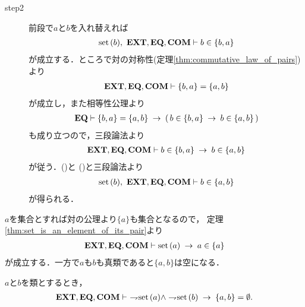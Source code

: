 \begin{sketch}
\begin{description}
			\item[step2]
				前段で$a$と$b$を入れ替えれば
				\begin{align}
					\operatorname*{set}\hspace{0.15em}(b),\ \mbox{{\bf EXT}},\mbox{{\bf EQ}},\mbox{\bf COM} \vdash b \in \{b,a\}
					\label{fom:set_is_an_element_of_its_pair_3}
				\end{align}
				が成立する．ところで対の対称性(定理\ref{thm:commutative_law_of_pairs})より
				\begin{align}
					\mbox{{\bf EXT}},\mbox{{\bf EQ}},\mbox{\bf COM} \vdash \{b,a\} = \{a,b\}
				\end{align}
				が成立し，また相等性公理より
				\begin{align}
					\mbox{{\bf EQ}} \vdash \{b,a\} = \{a,b\}
					\hspace{0.25em}\rightarrow\hspace{0.25em} (\, b \in \{b,a\} \hspace{0.25em}\rightarrow\hspace{0.25em} b \in \{a,b\}\, )
				\end{align}
				も成り立つので，三段論法より
				\begin{align}
					\mbox{{\bf EXT}},\mbox{{\bf EQ}},\mbox{\bf COM} \vdash b \in \{b,a\} \hspace{0.25em}\rightarrow\hspace{0.25em} b \in \{a,b\}
					\label{fom:set_is_an_element_of_its_pair_4}
				\end{align}
				が従う．()と
				()と三段論法より
				\begin{align}
					\operatorname*{set}\hspace{0.15em}(b),\ \mbox{{\bf EXT}},\mbox{{\bf EQ}},\mbox{\bf COM} \vdash b \in \{a,b\}
				\end{align}
				が得られる．
				\QED
		\end{description}
	\end{sketch}
	
	$a$を集合とすれば対の公理より$\{a\}$も集合となるので，
	定理\ref{thm:set_is_an_element_of_its_pair}より
	\begin{align}
		\mbox{{\bf EXT}},\mbox{{\bf EQ}},\mbox{\bf COM} \vdash \operatorname*{set}\hspace{0.15em}(a) \hspace{0.25em}\rightarrow\hspace{0.25em} a \in \{a\}
	\end{align}
	が成立する．一方で$a$も$b$も真類であると$\{a,b\}$は空になる．
	
	\begin{screen}
		\begin{thm}[真類同士の対は空]\label{thm:pair_of_proper_classes_is_emptyset}
			$a$と$b$を類とするとき，
			\begin{align}
				\EXTAX,\EQAX,\COMAX \vdash\ 
				\negation \set{a} \wedge \negation \set{b} \rarrow \{a,b\} = \emptyset.
			\end{align}
		\end{thm}
	\end{screen}
	
